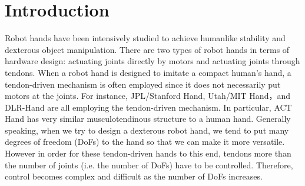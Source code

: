 \documentclass{llncs}
\begin{document}
\section{Introduction} %
\label{sec:introduction}
Robot hands have been intensively studied to achieve humanlike stability
and dexterous object manipulation.
There are two types of robot hands in terms of hardware design: 
actuating joints directly by motors and actuating joints through tendons.
When a robot hand is designed to imitate a compact human's hand,
a tendon-driven mechanism is often employed
since it does not necessarily put motors at the joints.
For instance, JPL/Stanford Hand\cite{salisbury1982}, Utah/MIT
Hand\cite{Jacobsen1986}，and DLR-Hand\cite{Butterfass2001} are all
employing the tendon-driven mechanism.
In particular, ACT Hand\cite{vande2004} has very similar musculotendinous
structure to a human hand.
Generally speaking, when we try to design a dexterous robot hand,
we tend to put many degrees of freedom (DoFs) to the hand
so that we can make it more versatile.
However in order for these tendon-driven hands to this end,
tendons more than the number of joints (i.e. the number of DoFs) have to be controlled.
Therefore, control becomes complex and difficult as the number of DoFs increases.
\end{document}
